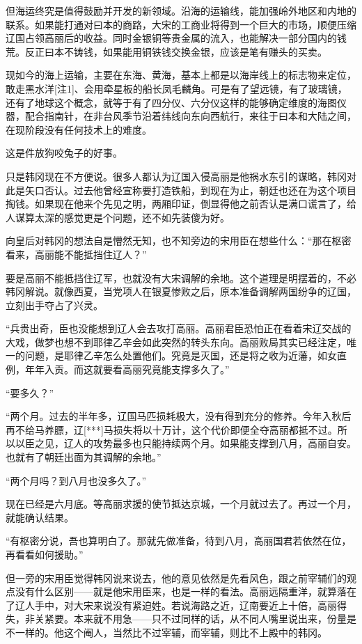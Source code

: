 但海运终究是值得鼓励并开发的新领域。沿海的运输线，能加强岭外地区和内地的联系。如果能打通对曰本的商路，大宋的工商业将得到一个巨大的市场，顺便压缩辽国占领高丽后的收益。同时金银铜等贵金属的流入，也能解决一部分国内的钱荒。反正曰本不铸钱，如果能用铜铁钱交换金银，应该是笔有赚头的买卖。

现如今的海上运输，主要在东海、黄海，基本上都是以海岸线上的标志物来定位，敢走黑水洋[注1]、会用牵星板的船长凤毛麟角。可是有了望远镜，有了玻璃镜，还有了地球这个概念，就等于有了四分仪、六分仪这样的能够确定维度的海图仪器，配合指南针，在非台风季节沿着纬线向东向西航行，来往于曰本和大陆之间，在现阶段没有任何技术上的难度。

这是件放狗咬兔子的好事。

只是韩冈现在不方便说。很多人都认为辽国入侵高丽是他祸水东引的谋略，韩冈对此是矢口否认。过去他曾经宣称要打造铁船，到现在为止，朝廷也还在为这个项目掏钱。如果现在他来个先见之明，两厢印证，倒显得他之前否认是满口谎言了，给人谋算太深的感觉更是个问题，还不如先装傻为好。

向皇后对韩冈的想法自是懵然无知，也不知旁边的宋用臣在想些什么：“那在枢密看来，高丽能不能抵挡住辽人？”

要是高丽不能抵挡住辽军，也就没有大宋调解的余地。这个道理是明摆着的，不必韩冈解说。就像西夏，当党项人在银夏惨败之后，原本准备调解两国纷争的辽国，立刻出手夺占了兴灵。

“兵贵出奇，臣也没能想到辽人会去攻打高丽。高丽君臣恐怕正在看着宋辽交战的大戏，做梦也想不到耶律乙辛会如此突然的转头东向。高丽败局其实已经注定，唯一的问题，是耶律乙辛怎么处置他们。究竟是灭国，还是将之收为近藩，如女直例，年年入贡。而这就要看高丽究竟能支撑多久了。”

“要多久？”

“两个月。过去的半年多，辽国马匹损耗极大，没有得到充分的修养。今年入秋后再不给马养膘，辽[***]马损失将以十万计，这个代价即便全夺高丽都抵不过。所以以臣之见，辽人的攻势最多也只能持续两个月。如果能支撑到八月，高丽自安。也就有了朝廷出面为其调解的余地。”

“两个月吗？到八月也没多久了。”

现在已经是六月底。等高丽求援的使节抵达京城，一个月就过去了。再过一个月，就能确认结果。

“有枢密分说，吾也算明白了。那就先做准备，待到八月，高丽国君若依然在位，再看看如何援助。”

但一旁的宋用臣觉得韩冈说来说去，他的意见依然是先看风色，跟之前宰辅们的观点没有什么区别——就是他宋用臣来，也是一样的看法。高丽远隔重洋，就算落在了辽人手中，对大宋来说没有紧迫姓。若说海路之近，辽南要近上十倍，高丽得失，非关紧要。本来就不用急——只不过同样的话，从不同人嘴里说出来，份量是不一样的。他这个阉人，当然比不过宰辅，而宰辅，则比不上殿中的韩冈。

